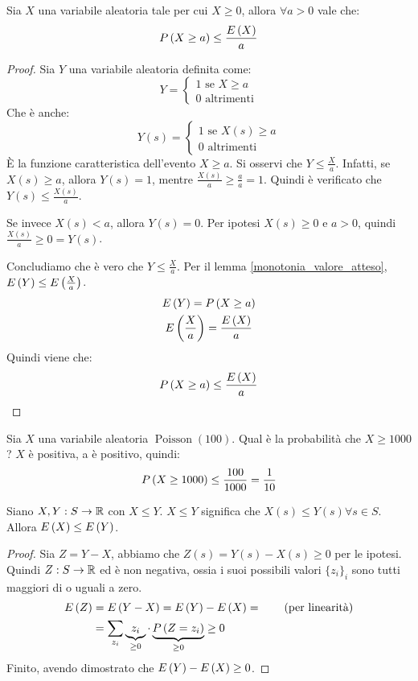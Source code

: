 \begin{prop}
Sia $X$ una variabile aleatoria tale per cui $X \ge 0$, allora $\forall a > 0$ vale che:
\[
P \left( {X \ge a} \right) \le \frac{E \left( X \right)}{a}
\]
\end{prop}
\begin{proof}
Sia $Y$ una variabile aleatoria definita come:
\[
Y = 
\begin{cases}
1 \text{ se } X \ge a \\
0 \text{ altrimenti}
\end{cases}
\]
Che \`e anche:
\[
Y(s) = 
\begin{cases}
1 \text{ se } X(s) \ge a \\
0 \text{ altrimenti}
\end{cases}
\]
\`E la funzione caratteristica dell'evento $X \ge a$. Si osservi che $Y \le \frac{X}{a}$. Infatti, se $X(s) \ge a$, allora $Y(s) = 1$, mentre $\frac{X(s)}{a} \ge \frac{a}{a} = 1$. Quindi \`e verificato che $Y(s) \le \frac{X(s)}{a}$.

Se invece $X(s) < a$, allora $Y(s) = 0$. Per ipotesi $X(s) \ge 0$ e $a > 0$, quindi $\frac{X(s)}{a} \ge 0 = Y(s)$.

Concludiamo che \`e vero che $Y \le \frac{X}{a}$. Per il lemma \ref{monotonia_valore_atteso}, $E \left( Y \right) \le E \left( \frac{X}{a} \right)$.
\begin{gather*}
E \left( Y \right) = P \left( {X \ge a} \right) \\
E \left( \frac{X}{a} \right) = \frac{E \left( X \right)}{a}
\end{gather*}
Quindi viene che:
\[
P \left( {X \ge a} \right) \le \frac{E \left( X \right)}{a}
\]
\end{proof}

\begin{exmp}
Sia $X$ una variabile aleatoria $\operatorname{Poisson} (100)$. Qual \`e la probabilit\`a che $X \ge 1000$? $X$ \`e positiva, a \`e positivo, quindi:
\[
P \left( {X \ge 1000} \right) \le \frac{100}{1000} = \frac{1}{10}
\]
\end{exmp}

\begin{lem}\label{monotonia_valore_atteso}
Siano $X, Y : S \to \mathbb{R}$ con $X \le Y$. $X \le Y$ significa che $X(s) \le Y(s) \forall s \in S$. Allora $E \left( X \right) \le E \left( Y \right)$.
\end{lem}
\begin{proof}
Sia $Z = Y - X$, abbiamo che $Z(s) = Y(s) - X(s) \ge 0$ per le ipotesi. Quindi $Z : S \to \mathbb{R}$ ed \`e non negativa, ossia i suoi possibili valori $\{ z_i \}_{i}$ sono tutti maggiori di o uguali a zero.
\begin{align*}
E \left( Z \right) &= E \left( Y - X \right) = E \left( Y \right) - E \left( X \right) = \tag{per linearit\`a} \\
&= \sum_{z_i} \underbrace{z_i}_{\ge 0} \cdot \underbrace{P \left( {Z = z_i} \right)}_{\ge 0} \ge 0
\end{align*}
Finito, avendo dimostrato che $E \left( Y \right) - E \left( X \right) \ge 0$.
\end{proof}


